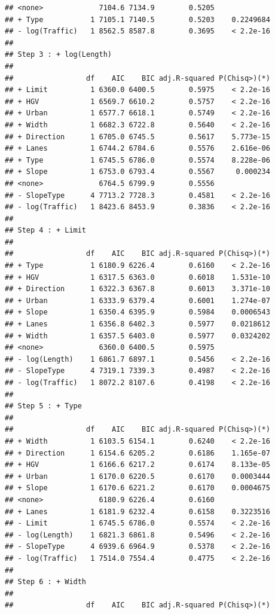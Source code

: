 \documentclass[
]{article}
\begin{document}
\begin{verbatim}
## <none>             7104.6 7134.9        0.5205             
## + Type           1 7105.1 7140.5        0.5203    0.2249684
## - log(Traffic)   1 8562.5 8587.8        0.3695    < 2.2e-16
## 
## Step 3 : + log(Length) 
## 
##                 df    AIC    BIC adj.R-squared P(Chisq>)(*)
## + Limit          1 6360.0 6400.5        0.5975    < 2.2e-16
## + HGV            1 6569.7 6610.2        0.5757    < 2.2e-16
## + Urban          1 6577.7 6618.1        0.5749    < 2.2e-16
## + Width          1 6682.3 6722.8        0.5640    < 2.2e-16
## + Direction      1 6705.0 6745.5        0.5617    5.773e-15
## + Lanes          1 6744.2 6784.6        0.5576    2.616e-06
## + Type           1 6745.5 6786.0        0.5574    8.228e-06
## + Slope          1 6753.0 6793.4        0.5567     0.000234
## <none>             6764.5 6799.9        0.5556             
## - SlopeType      4 7713.2 7728.3        0.4581    < 2.2e-16
## - log(Traffic)   1 8423.6 8453.9        0.3836    < 2.2e-16
## 
## Step 4 : + Limit 
## 
##                 df    AIC    BIC adj.R-squared P(Chisq>)(*)
## + Type           1 6180.9 6226.4        0.6160    < 2.2e-16
## + HGV            1 6317.5 6363.0        0.6018    1.531e-10
## + Direction      1 6322.3 6367.8        0.6013    3.371e-10
## + Urban          1 6333.9 6379.4        0.6001    1.274e-07
## + Slope          1 6350.4 6395.9        0.5984    0.0006543
## + Lanes          1 6356.8 6402.3        0.5977    0.0218612
## + Width          1 6357.5 6403.0        0.5977    0.0324202
## <none>             6360.0 6400.5        0.5975             
## - log(Length)    1 6861.7 6897.1        0.5456    < 2.2e-16
## - SlopeType      4 7319.1 7339.3        0.4987    < 2.2e-16
## - log(Traffic)   1 8072.2 8107.6        0.4198    < 2.2e-16
## 
## Step 5 : + Type 
## 
##                 df    AIC    BIC adj.R-squared P(Chisq>)(*)
## + Width          1 6103.5 6154.1        0.6240    < 2.2e-16
## + Direction      1 6154.6 6205.2        0.6186    1.165e-07
## + HGV            1 6166.6 6217.2        0.6174    8.133e-05
## + Urban          1 6170.0 6220.5        0.6170    0.0003444
## + Slope          1 6170.6 6221.2        0.6170    0.0004675
## <none>             6180.9 6226.4        0.6160             
## + Lanes          1 6181.9 6232.4        0.6158    0.3223516
## - Limit          1 6745.5 6786.0        0.5574    < 2.2e-16
## - log(Length)    1 6821.3 6861.8        0.5496    < 2.2e-16
## - SlopeType      4 6939.6 6964.9        0.5378    < 2.2e-16
## - log(Traffic)   1 7514.0 7554.4        0.4775    < 2.2e-16
## 
## Step 6 : + Width 
## 
##                 df    AIC    BIC adj.R-squared P(Chisq>)(*)

\end{verbatim}
\end{document}
